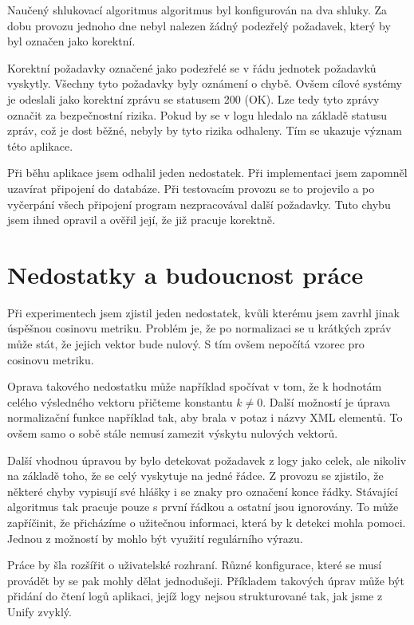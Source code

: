 \documentclass[thesis=M,czech]{FITthesis}[2012/10/20]
\begin{document}
			Naučený shlukovací algoritmus algoritmus byl konfigurován na dva shluky. Za dobu provozu jednoho dne nebyl nalezen žádný podezřelý požadavek, který by byl označen jako korektní.
			
			Korektní požadavky označené jako podezřelé se v řádu jednotek požadavků vyskytly. Všechny tyto požadavky byly oznámení o chybě. Ovšem cílové systémy je odeslali jako korektní zprávu se statusem 200 (OK). Lze tedy tyto zprávy označit za bezpečnostní rizika. Pokud by se v logu hledalo na základě statusu zpráv, což je dost běžné, nebyly by tyto rizika odhaleny. Tím se ukazuje význam této aplikace.
			
			Při běhu aplikace jsem odhalil jeden nedostatek. Při implementaci jsem zapomněl uzavírat připojení do databáze. Při testovacím provozu se to projevilo a po vyčerpání všech připojení program nezpracovával další požadavky. Tuto chybu jsem ihned opravil a ověřil její, že již pracuje korektně.
		
		\section{Nedostatky a budoucnost práce}
			Při experimentech jsem zjistil jeden nedostatek, kvůli kterému jsem zavrhl jinak úspěšnou cosinovu metriku. Problém je, že po normalizaci se u krátkých zpráv může stát, že jejich vektor bude nulový. S tím ovšem nepočítá vzorec pro cosinovu metriku.
			
			Oprava takového nedostatku může například spočívat v tom, že k hodnotám celého výsledného vektoru přičteme konstantu $k \neq 0$. Další možností je úprava normalizační funkce například tak, aby brala v potaz i názvy XML elementů. To ovšem samo o sobě stále nemusí zamezit výskytu nulových vektorů.
			
			Další vhodnou úpravou by bylo detekovat požadavek z logy jako celek, ale nikoliv na základě toho, že se celý vyskytuje na jedné řádce. Z provozu se zjistilo, že některé chyby vypisují své hlášky i se znaky pro označení konce řádky. Stávající algoritmus tak pracuje pouze s první řádkou a ostatní jsou ignorovány. To může zapříčinit, že přicházíme o užitečnou informaci, která by k detekci mohla pomoci. Jednou z možností by mohlo být využití regulárního výrazu.
			
			Práce by šla rozšířit o uživatelské rozhraní. Různé konfigurace, které se musí provádět by se pak mohly dělat jednodušeji. Příkladem takových úprav může být přidání do čtení logů aplikaci, jejíž logy nejsou strukturované tak, jak jsme z Unify zvyklý. 
	
\end{document}
